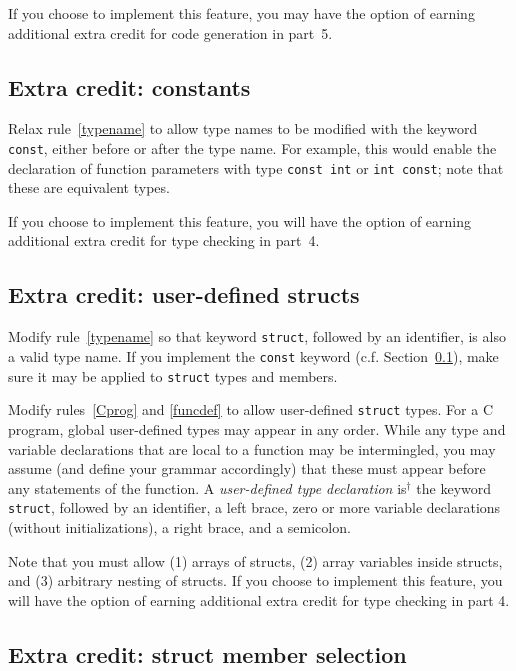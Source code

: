 \documentclass{article}
\newcommand{\iseasier}{is$^\dagger$ }
\newcommand{\typecheck}{4}
\newcommand{\codegen}{5}
\begin{document}
If you choose to implement this feature,
you may have the option of earning
additional extra credit for code generation
in part~\codegen.

\subsection{Extra credit: constants}
\label{SEC:constants}

Relax rule~\ref{typename} to allow type names to be modified
with the keyword {\tt const}, either before or after the type name.
For example,
this would enable the declaration of function parameters
with type \lstinline{const int} or \lstinline{int const};
note that these are equivalent types.

If you choose to implement this feature,
you will have the option of earning
additional extra credit for type checking
in part~\typecheck.


\subsection{Extra credit: user-defined structs}
\label{SEC:userstructs}

Modify rule~\ref{typename} so that keyword {\tt struct},
followed by an identifier,
is also a valid type name.
If you implement the {\tt const} keyword (c.f. Section~\ref{SEC:constants}),
make sure it may be applied to {\tt struct} types
and members.

Modify rules~\ref{Cprog} and \ref{funcdef} to allow user-defined
{\tt struct} types.
For a C program, global user-defined types may appear in any order.
While any type and variable declarations that are local to a function
may be intermingled,
you may assume (and define your grammar accordingly)
that these must appear before any statements of the function.
A \emph{user-defined type declaration} \iseasier the keyword {\tt struct},
followed by an identifier, a left brace,
  zero or more variable declarations (without initializations),
a right brace, and a semicolon.

Note that you must allow (1) arrays of structs, (2) array variables
inside structs, and (3) arbitrary nesting of structs.
%
If you choose to implement this feature,
you will have the option of earning
additional extra credit for type checking
in part \typecheck.

\subsection{Extra credit: struct member selection}
\label{SEC:lastextra}
\label{SEC:members}
\end{document}
